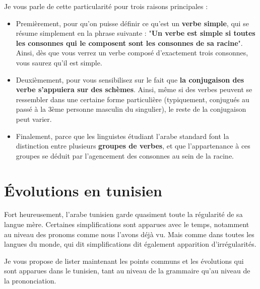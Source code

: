 Je vous parle de cette particularité pour trois raisons principales :
\begin{itemize}
    \item Premièrement, pour qu'on puisse définir ce qu'est un \textbf{verbe simple}, qui se résume simplement en la phrase suivante : "\textbf{Un verbe est simple si toutes les consonnes qui le composent sont les consonnes de sa racine}". Ainsi, dès que vous verrez un verbe composé d'exactement trois consonnes, vous saurez qu'il est simple.
    \item Deuxièmement, pour vous sensibilisez sur le fait que \textbf{la conjugaison des verbe s'appuiera sur des schèmes}. Ainsi, même si des verbes peuvent se ressembler dans une certaine forme particulière (typiquement, conjugués au passé à la 3ème personne masculin du singulier), le reste de la conjugaison peut varier.
    \item Finalement, parce que les linguistes étudiant l'arabe standard font la distinction entre plusieurs \textbf{groupes de verbes}, et que l'appartenance à ces groupes se déduit par l'agencement des consonnes au sein de la racine. 
\end{itemize}


\section{Évolutions en tunisien}

Fort heureusement, l'arabe tunisien garde quasiment toute la régularité de sa langue mère. Certaines simplifications sont apparues avec le temps, notamment au niveau des pronoms comme nous l'avons déjà vu. Mais comme dans toutes les langues du monde, qui dit simplifications dit également apparition d'irrégularités.

Je vous propose de lister maintenant les points communs et les évolutions qui sont apparues dans le tunisien, tant au niveau de la grammaire qu'au niveau de la prononciation.

